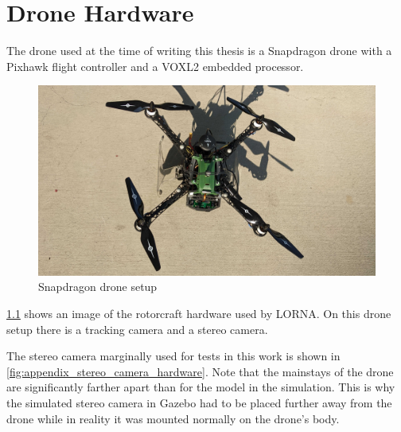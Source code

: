 \chapter{Drone Hardware}
\label{sec:drone}

The drone used at the time of writing this thesis is a Snapdragon drone with a Pixhawk flight controller and a VOXL2 embedded processor.

\begin{figure}[h]
\centering
\includegraphics[scale=0.5]{images/appendix/Drone/drone.jpg}
\caption{Snapdragon drone setup}
\label{fig:appendix_drone_hardware}
\end{figure}

\cref{fig:appendix_drone_hardware} shows an image of the rotorcraft hardware used by LORNA. On this drone setup there is a tracking camera and a stereo camera.

The stereo camera marginally used for tests in this work is shown in \cref{fig:appendix_stereo_camera_hardware}. Note that the mainstays of the drone are significantly farther apart than for the model in the simulation. This is why the simulated stereo camera in Gazebo had to be placed further away from the drone while in reality it was mounted normally on the drone's body.

